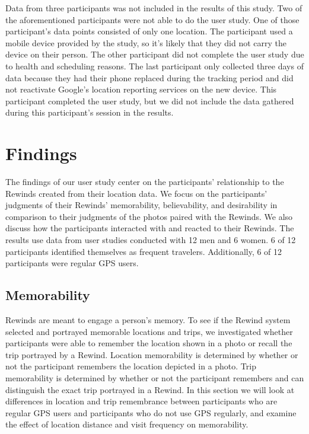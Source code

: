 \documentclass{sigchi}
\begin{document}
Data from three participants was not included in the results of this study. Two of the aforementioned participants were not able to do the user study. One of those participant's data points consisted of only one location. The participant used a mobile device provided by the study, so it's likely that they did not carry the device on their person. The other participant did not complete the user study due to health and scheduling reasons. The last participant only collected three days of data because they had their phone replaced during the tracking period and did not reactivate Google's location reporting services on the new device. This participant completed the user study, but we did not include the data gathered during this participant's session in the results.

\section{Findings}
The findings of our user study center on the participants' relationship to the Rewinds created from their location data. We focus on the participants' judgments of their Rewinds' memorability, believability, and desirability in comparison to their judgments of the photos paired with the Rewinds. We also discuss how the participants interacted with and reacted to their Rewinds. The results use data from user studies conducted with 12 men and 6 women. 6 of 12 participants identified themselves as frequent travelers. Additionally, 6 of 12 participants were regular GPS users.

\subsection{Memorability}
Rewinds are meant to engage a person's memory. To see if the Rewind system selected and portrayed memorable locations and trips, we investigated whether participants were able to remember the location shown in a photo or recall the trip portrayed by a Rewind. Location memorability is determined by whether or not the participant remembers the location depicted in a photo. Trip memorability is determined by whether or not the participant remembers and can distinguish the exact trip portrayed in a Rewind. In this section we will look at differences in location and trip remembrance between participants who are regular GPS users and participants who do not use GPS regularly, and examine the effect of location distance and visit frequency on memorability.
\end{document}
